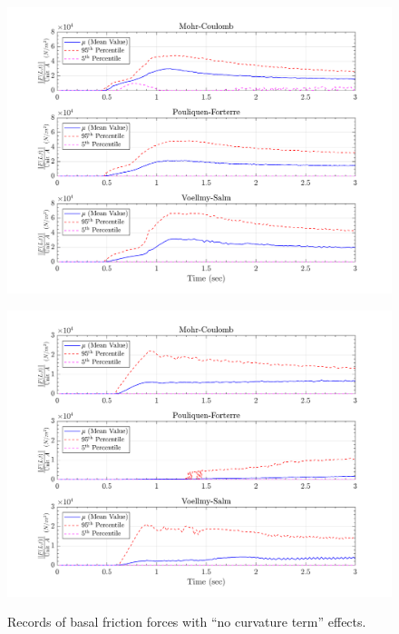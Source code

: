 \documentclass{article}
\begin{document}
\begin{figure}[H]
	\begin{minipage}[b]{0.5\linewidth}
    	\centering
    	\includegraphics[width=1\textwidth]{InclinedPlane/LocalRecords/Records/Fb_L15.png}
    	\label{fig:Ramp-L3-Fb}
	\end{minipage}
	\begin{minipage}[b]{0.5\linewidth}
		\centering
		\includegraphics[width=1\textwidth]{InclinedPlane/LocalRecords/Records/Fb_L17.png}
    	\label{fig:Ramp-L4-Fb}
    \end{minipage}
    \caption{Records of basal friction forces with ``no curvature term'' effects.}
    \label{fig:Ramp-LM-Fb}     
\end{figure}
\end{document}
